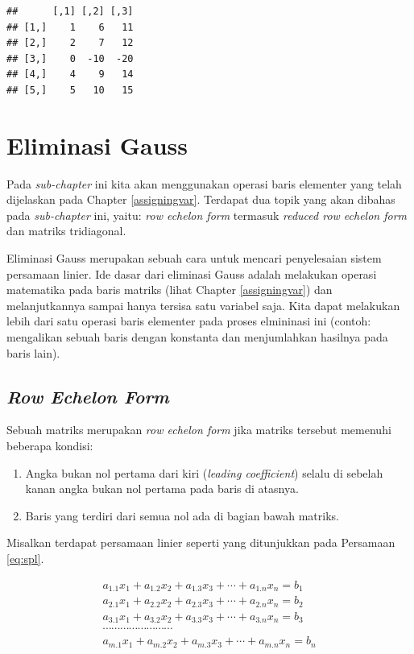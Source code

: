 \documentclass[
]{book}
\providecommand{\tightlist}{%
  \setlength{\itemsep}{0pt}\setlength{\parskip}{0pt}}
\theoremstyle{definition}
\theoremstyle{definition}
\theoremstyle{definition}
\theoremstyle{definition}
\theoremstyle{remark}
\begin{document}
\begin{verbatim}
##      [,1] [,2] [,3]
## [1,]    1    6   11
## [2,]    2    7   12
## [3,]    0  -10  -20
## [4,]    4    9   14
## [5,]    5   10   15
\end{verbatim}

\hypertarget{gausselimination}{%
\section{Eliminasi Gauss}\label{gausselimination}}

Pada \emph{sub-chapter} ini kita akan menggunakan operasi baris elementer yang telah dijelaskan pada Chapter \ref{assigningvar}. Terdapat dua topik yang akan dibahas pada \emph{sub-chapter} ini, yaitu: \emph{row echelon form} termasuk \emph{reduced row echelon form} dan matriks tridiagonal.

Eliminasi Gauss merupakan sebuah cara untuk mencari penyelesaian sistem persamaan linier. Ide dasar dari eliminasi Gauss adalah melakukan operasi matematika pada baris matriks (lihat Chapter \ref{assigningvar}) dan melanjutkannya sampai hanya tersisa satu variabel saja. Kita dapat melakukan lebih dari satu operasi baris elementer pada proses elmininasi ini (contoh: mengalikan sebuah baris dengan konstanta dan menjumlahkan hasilnya pada baris lain).

\hypertarget{rowechelonform}{%
\subsection{\texorpdfstring{\emph{Row Echelon Form}}{Row Echelon Form}}\label{rowechelonform}}

Sebuah matriks merupakan \emph{row echelon form} jika matriks tersebut memenuhi beberapa kondisi:

\begin{enumerate}
\def\labelenumi{\arabic{enumi}.}
\tightlist
\item
  Angka bukan nol pertama dari kiri (\emph{leading coefficient}) selalu di sebelah kanan angka bukan nol pertama pada baris di atasnya.
\item
  Baris yang terdiri dari semua nol ada di bagian bawah matriks.
\end{enumerate}

Misalkan terdapat persamaan linier seperti yang ditunjukkan pada Persamaan \eqref{eq:spl}.

\begin{equation}
\begin{matrix}
  a_{1.1}x_1+a_{1.2}x_2+a_{1.3}x_3+\cdots+a_{1.n}x_n=b_1 \\
  a_{2.1}x_1+a_{2.2}x_2+a_{2.3}x_3+\cdots+a_{2.n}x_n=b_2 \\
  a_{3.1}x_1+a_{3.2}x_2+a_{3.3}x_3+\cdots+a_{3.n}x_n=b_3 \\
  \cdots\cdots\cdots\cdots\cdots\cdots\cdots\cdots       \\
  a_{m.1}x_1+a_{m.2}x_2+a_{m.3}x_3+\cdots+a_{m.n}x_n=b_n
 \end{matrix}
  \label{eq:spl}
\end{equation}
\end{document}
